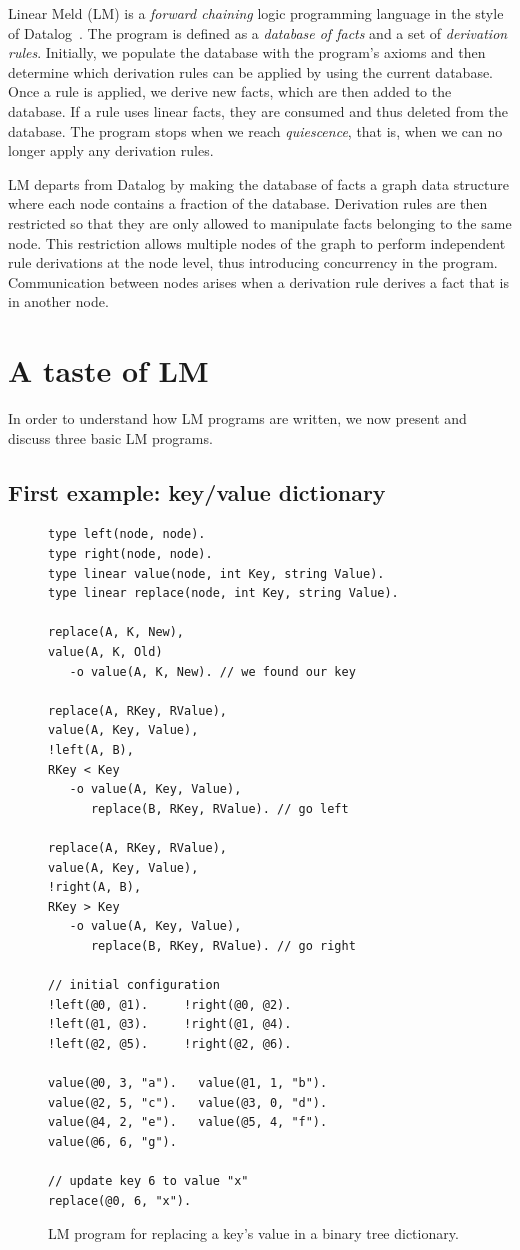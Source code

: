 
Linear Meld (LM) is a \emph{forward chaining} logic programming language in the
style of Datalog~\cite{Ullman:1990:PDK:533142}. The program is defined as a
\emph{database of facts} and a set of \emph{derivation rules}.  Initially, we
populate the database with the program's axioms and then determine which
derivation rules can be applied by using the current database. Once a rule is
applied, we derive new facts, which are then added to the database.  If a rule
uses linear facts, they are consumed and thus deleted from the database.  The
program stops when we reach \emph{quiescence}, that is, when we can no longer
apply any derivation rules.

LM departs from Datalog by making the database of facts a graph data structure
where each node contains a fraction of the database. Derivation rules are then
restricted so that they are only allowed to manipulate facts belonging to the
same node. This restriction allows multiple nodes of the graph to perform
independent rule derivations at the node level, thus introducing concurrency in
the program. Communication between nodes arises when a derivation rule derives a
fact that is in another node.

\section{A taste of LM}

In order to understand how LM programs are written, we now present and discuss
three basic LM programs.

\subsection{First example: key/value dictionary}

\begin{figure}[ht]
{\scriptsize
\begin{Verbatim}[numbers=right]
type left(node, node).
type right(node, node).
type linear value(node, int Key, string Value).
type linear replace(node, int Key, string Value).

replace(A, K, New),
value(A, K, Old)
   -o value(A, K, New). // we found our key

replace(A, RKey, RValue),
value(A, Key, Value),
!left(A, B),
RKey < Key
   -o value(A, Key, Value),
      replace(B, RKey, RValue). // go left

replace(A, RKey, RValue),
value(A, Key, Value),
!right(A, B),
RKey > Key
   -o value(A, Key, Value),
      replace(B, RKey, RValue). // go right

// initial configuration
!left(@0, @1).     !right(@0, @2).
!left(@1, @3).     !right(@1, @4). 
!left(@2, @5).     !right(@2, @6).

value(@0, 3, "a").   value(@1, 1, "b").
value(@2, 5, "c").   value(@3, 0, "d").
value(@4, 2, "e").   value(@5, 4, "f").
value(@6, 6, "g").

// update key 6 to value "x"
replace(@0, 6, "x").
\end{Verbatim}
}
\caption{LM program for replacing a key's value in a binary tree dictionary.}
\label{code:btree_replace}
\end{figure}

